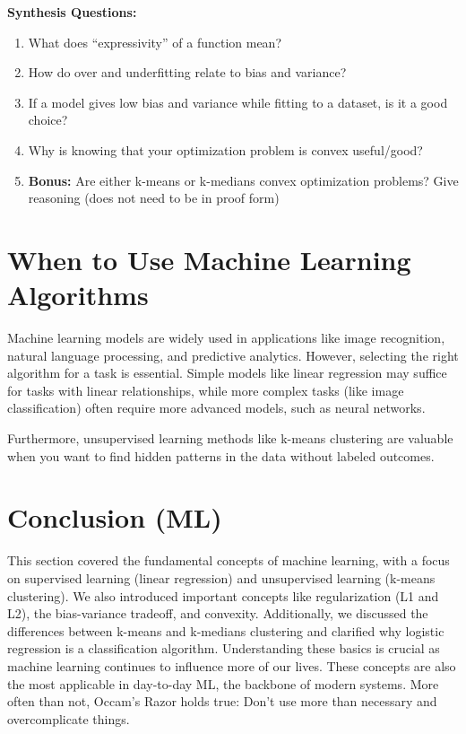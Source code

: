 \begin{questionbox}
\textbf{Synthesis Questions:}
\begin{enumerate}
    \item What does ``expressivity''  of a function mean?
    \item How do over and underfitting relate to bias and variance?
    \item If a model gives low bias and variance while fitting to a dataset, is it a good choice?
    \item Why is knowing that your optimization problem is convex useful/good?
    \item \textbf{Bonus:} Are either k-means or k-medians convex optimization problems? Give reasoning (does not need to be in proof form)
\end{enumerate}
\end{questionbox}

\section{When to Use Machine Learning Algorithms}
\begin{flushleft}
    \large Machine learning models are widely used in applications like image recognition, natural language processing, and predictive analytics. However, selecting the right algorithm for a task is essential. Simple models like linear regression may suffice for tasks with linear relationships, while more complex tasks (like image classification) often require more advanced models, such as neural networks. \break
    
    Furthermore, unsupervised learning methods like k-means clustering are valuable when you want to find hidden patterns in the data without labeled outcomes. \break
\end{flushleft}

\section{Conclusion (ML)}
\begin{flushleft}
    \large This section covered the fundamental concepts of machine learning, with a focus on supervised learning (linear regression) and unsupervised learning (k-means clustering). We also introduced important concepts like regularization (L1 and L2), the bias-variance tradeoff, and convexity. Additionally, we discussed the differences between k-means and k-medians clustering and clarified why logistic regression is a classification algorithm. Understanding these basics is crucial as machine learning continues to influence more of our lives. These concepts are also the most applicable in day-to-day ML, the backbone of modern systems. More often than not, Occam's Razor holds true: Don't use more than necessary and overcomplicate things. \break
\end{flushleft}
